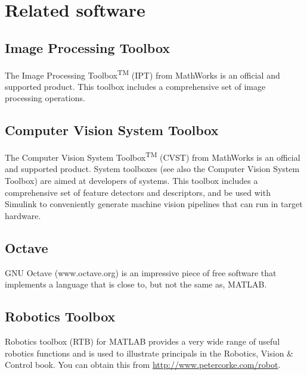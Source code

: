 \documentclass[a4paper,twoside]{report}
\def\Mlab{MATLAB}
\begin{document}
{\section{Related software}
\subsection{Image Processing Toolbox}
The Image Processing Toolbox\textsuperscript{TM} (IPT) from MathWorks is an official and supported product. 
This toolbox includes a comprehensive set of image processing operations.

\subsection{Computer Vision System Toolbox}
The Computer Vision System Toolbox\textsuperscript{TM} (CVST) from MathWorks is an official and supported product.  System toolboxes (see also the Computer Vision System Toolbox) are aimed at developers of systems. 
This toolbox includes a comprehensive set of feature detectors and descriptors, and be used with Simulink to conveniently generate machine vision
pipelines that can run in target hardware.

\subsection{Octave}
GNU Octave (www.octave.org) is an impressive piece of free software that implements a language that is close to, but not the same as, \Mlab. 

\subsection{Robotics Toolbox}
Robotics toolbox (RTB) for {\Mlab} provides a very wide range of useful robotics functions and is used to illustrate principals in the Robotics, Vision \& Control book.  You can obtain this from \url{http://www.petercorke.com/robot}.


}
\end{document}
